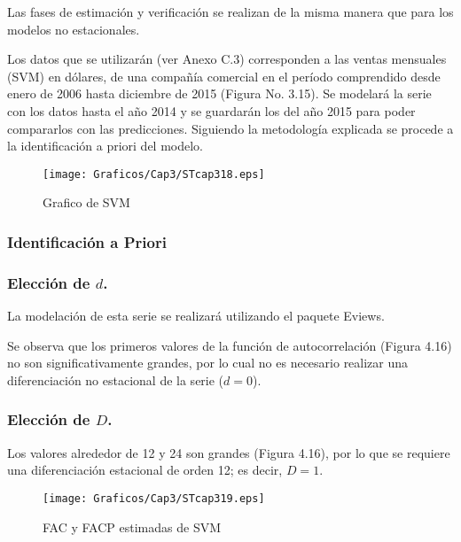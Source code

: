 Las fases de estimaci\'{o}n y verificaci\'{o}n se realizan de la misma manera que para los modelos no estacionales.

\begin{ejemplo} Los datos que se utilizar\'{a}n (ver Anexo C.3) corresponden a las ventas mensuales (SVM) en d\'{o}lares, de una compa\~{n}\'{i}a comercial en el per\'{i}odo comprendido desde enero de 2006 hasta diciembre de 2015 (Figura No. 3.15). Se modelar\'{a} la serie con los datos hasta el a\~{n}o 2014 y se guardar\'{a}n los del a\~{n}o 2015 para poder compararlos con las predicciones. Siguiendo la metodolog\'{i}a explicada se procede a la identificaci\'{o}n a priori del modelo.

\begin{figure}[H]
\centering
\texttt{[image: Graficos/Cap3/STcap318.eps]}
\caption{Grafico de SVM}
\end{figure}

\end{ejemplo}


\subsubsection*{Identificaci\'{o}n a Priori}

\subsubsection*{Elecci\'{o}n de $d$.}

La modelaci\'{o}n de esta serie se realizar\'{a} utilizando el paquete Eviews.\newline

Se observa que los primeros valores de la funci\'{o}n de autocorrelaci\'{o}n (Figura 4.16) no son significativamente grandes, por lo cual no es necesario realizar una diferenciaci\'{o}n no estacional de la serie ($d=0$).

\subsubsection*{Elecci\'{o}n de $D$.}

Los valores alrededor de 12 y 24 son grandes (Figura 4.16), por lo que se requiere una diferenciaci\'{o}n estacional de orden 12; es decir, $D=1$.

\begin{figure}[H]
\centering
\texttt{[image: Graficos/Cap3/STcap319.eps]}
\caption{FAC y FACP estimadas de SVM}
\end{figure}

